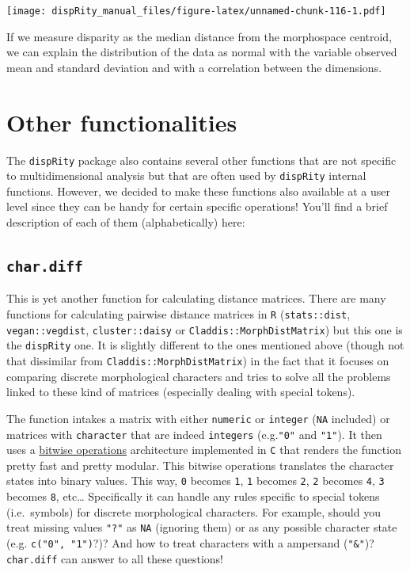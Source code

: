 \documentclass[]{book}
\begin{document}
\texttt{[image: dispRity\_manual\_files/figure-latex/unnamed-chunk-116-1.pdf]}

If we measure disparity as the median distance from the morphospace centroid, we can explain the distribution of the data as normal with the variable observed mean and standard deviation and with a correlation between the dimensions.

\hypertarget{other-functionalities}{%
\chapter{Other functionalities}\label{other-functionalities}}

The \texttt{dispRity} package also contains several other functions that are not specific to multidimensional analysis but that are often used by \texttt{dispRity} internal functions.
However, we decided to make these functions also available at a user level since they can be handy for certain specific operations!
You'll find a brief description of each of them (alphabetically) here:

\hypertarget{char.diff}{%
\section{\texorpdfstring{\texttt{char.diff}}{char.diff}}\label{char.diff}}

This is yet another function for calculating distance matrices.
There are many functions for calculating pairwise distance matrices in \texttt{R} (\texttt{stats::dist}, \texttt{vegan::vegdist}, \texttt{cluster::daisy} or \texttt{Claddis::MorphDistMatrix}) but this one is the \texttt{dispRity} one.
It is slightly different to the ones mentioned above (though not that dissimilar from \texttt{Claddis::MorphDistMatrix}) in the fact that it focuses on comparing discrete morphological characters and tries to solve all the problems linked to these kind of matrices (especially dealing with special tokens).

The function intakes a matrix with either \texttt{numeric} or \texttt{integer} (\texttt{NA} included) or matrices with \texttt{character} that are indeed \texttt{integers} (e.g.\texttt{"0"} and \texttt{"1"}).
It then uses a \href{https://en.wikipedia.org/wiki/Bitwise_operations_in_C}{bitwise operations} architecture implemented in \texttt{C} that renders the function pretty fast and pretty modular.
This bitwise operations translates the character states into binary values.
This way, \texttt{0} becomes \texttt{1}, \texttt{1} becomes \texttt{2}, \texttt{2} becomes \texttt{4}, \texttt{3} becomes \texttt{8}, etc\ldots{}
Specifically it can handle any rules specific to special tokens (i.e.~symbols) for discrete morphological characters. For example, should you treat missing values \texttt{"?"} as \texttt{NA} (ignoring them) or as any possible character state (e.g. \texttt{c("0",\ "1")}?)? And how to treat characters with a ampersand (\texttt{"\&"})? \texttt{char.diff} can answer to all these questions!
\end{document}
